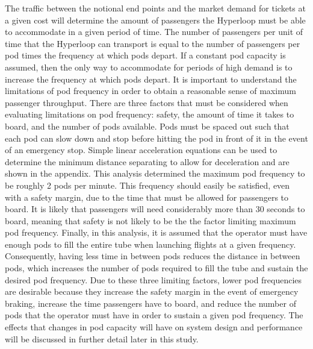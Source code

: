The traffic between the notional end points and the market demand for tickets
at a given cost will determine the amount of passengers the Hyperloop must be
able to accommodate in a given period of time. The number of passengers per
unit of time that the Hyperloop can transport is equal to the number of
passengers per pod times the frequency at which pods depart. If a constant pod
capacity is assumed, then the only way to accommodate for periods of high
demand is to increase the frequency at which pods depart. It is important to
understand the limitations of pod frequency in order to obtain a reasonable
sense of maximum passenger throughput.
There are three factors that must be considered when evaluating limitations on
pod frequency: safety, the amount of time it takes to board, and the number of
pods available. Pods must be spaced out such that each pod can slow down and
stop before hitting the pod in front of it in the event of an emergency stop.
Simple linear acceleration equations can be used to determine the minimum
distance separating to allow for deceleration and are shown in the appendix.
This analysis determined the maximum pod frequency to be roughly 2 pods per minute.
This frequency should easily be satisfied, even with a safety margin,
due to the time that must be allowed for passengers to board.
It is likely that passengers will need
considerably more than 30 seconds to board, meaning that safety is not likely
to be the the factor limiting maximum pod frequency. Finally, in this analysis,
it is assumed that the operator must have enough pods to fill the entire tube
when launching flights at a given frequency. Consequently, having less time in
between pods reduces the distance in between pods, which increases the number
of pods required to fill the tube and sustain the desired pod frequency.
Due to these three limiting factors, lower pod frequencies are desirable
because they increase the safety margin in the event of emergency braking,
increase the time passengers have to board, and reduce the number of pods that
the operator must have in order to sustain a given pod frequency. The effects
that changes in pod capacity will have on system design and performance will be
discussed in further detail later in this study.
